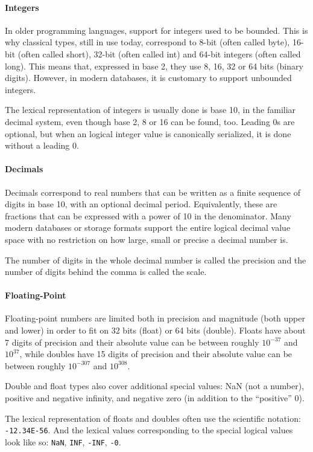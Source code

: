 \paragraph{Integers}
In older programming languages, support for integers used to be bounded. This is why classical types, still in use today, correspond to 8-bit (often called byte), 16-bit (often called short), 32-bit (often called int) and 64-bit integers (often called long). This means that, expressed in base 2, they use 8, 16, 32 or 64 bits (binary digits).
However, in modern databases, it is customary to support unbounded integers.

The lexical representation of integers is usually done is base 10, in the familiar decimal system, even though base 2, 8 or 16 can be found, too. Leading 0s are optional, but when an logical integer value is canonically serialized, it is done without a leading 0.

\paragraph{Decimals}
Decimals correspond to real numbers that can be written as a finite sequence of digits in base 10, with an optional decimal period. Equivalently, these are fractions that can be expressed with a power of 10 in the denominator.
Many modern databases or storage formats support the entire logical decimal value space with no restriction on how large, small or precise a decimal number is.

The number of digits in the whole decimal number is called the precision and the number of digits behind the comma is called the scale.

\paragraph{Floating-Point}
Floating-point numbers are limited both in precision and magnitude (both upper and lower) in order to fit on 32 bits (float) or 64 bits (double). Floats have about 7 digits of precision and their absolute value can be between roughly $10^{-37}$ and $10^{37}$, while doubles have 15 digits of precision and their absolute value can be between roughly $10^{-307}$ and $10^{308}$.

Double and float types also cover additional special values: NaN (not a number), positive and negative infinity, and negative zero (in addition to the “positive” 0).

The lexical representation of floats and doubles often use the scientific notation: \texttt{-12.34E-56}.
And the lexical values corresponding to the special logical values look like so: \texttt{NaN}, \texttt{INF}, \texttt{-INF}, \texttt{-0}.


